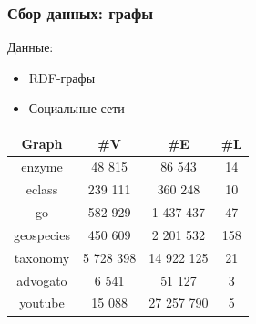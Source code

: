\documentclass{beamer}
\begin{document}
\begin{frame}[fragile]
  \frametitle{Сбор данных: графы}
  Данные:
  \begin{itemize}
    \item RDF-графы
    \item Социальные сети
  \end{itemize}
  \vspace{10pt}
  \noindent\begin{minipage}{1\textwidth}
    \begin{table}[!ht]
      \centering
      \begin{tabular}{|c|c|c|c|}
        \hline
        Graph      & \#V       & \#E        & \#L \\ \hline \hline
        enzyme     & 48 815    & 86 543     & 14  \\
        eclass     & 239 111   & 360 248    & 10  \\
        go         & 582 929   & 1 437 437  & 47  \\
        geospecies & 450 609   & 2 201 532  & 158 \\
        taxonomy   & 5 728 398 & 14 922 125 & 21  \\
        \hline
        advogato   & 6 541     & 51 127     & 3   \\
        youtube    & 15 088    & 27 257 790 & 5   \\
        \hline
      \end{tabular}
    \end{table}
  \end{minipage}
  \noindent\begin{minipage}{0.25\textwidth}
  \end{minipage}
\end{frame}
\end{document}
